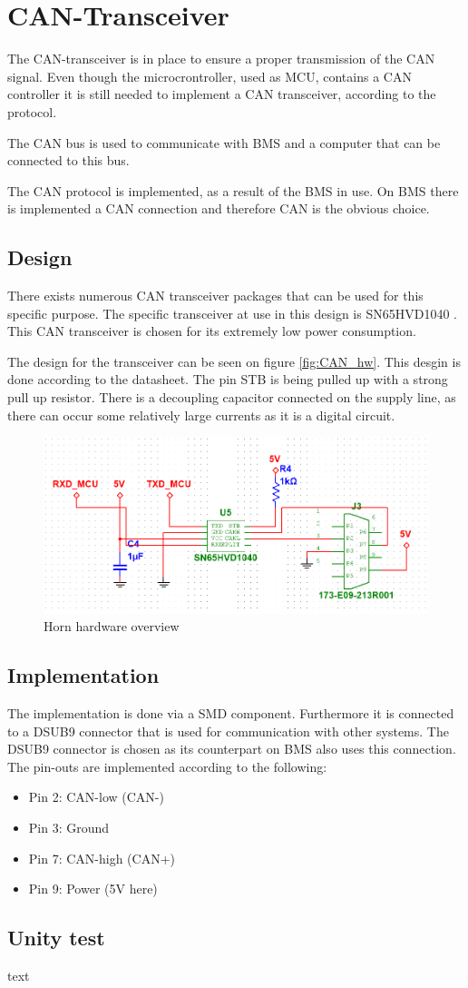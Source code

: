 \section{CAN-Transceiver}
\label{sec:CAN-Tranceiver}
The CAN-transceiver is in place to ensure a proper transmission of the CAN signal. Even though the microcrontroller, used as MCU, contains a CAN controller it is still needed to implement a CAN transceiver, according to the protocol.

The CAN bus is used to communicate with BMS and a computer that can be connected to this bus. 

The CAN protocol is implemented, as a result of the BMS in use. On BMS there is implemented a CAN connection and therefore CAN is the obvious choice.    

\subsection{Design}
There exists numerous CAN transceiver packages that can be used for this specific purpose. The specific transceiver at use in this design is SN65HVD1040 . This CAN transceiver is chosen for its extremely low power consumption. 

The design for the transceiver can be seen on figure \vref{fig:CAN_hw}. This desgin is done according to the datasheet. The pin STB is being pulled up with a strong pull up resistor. There is a decoupling capacitor connected on the supply line, as there can occur some relatively large currents as it is a digital circuit. 

\begin{figure}[H]
	\centering
	\includegraphics[width=0.7\linewidth]{Hardware/Pictures/CAN_transceiver}
	\caption{Horn hardware overview}
	\label{fig:CAN_hw}
\end{figure}

\subsection{Implementation}
The implementation is done via a SMD component. Furthermore it is connected to a DSUB9 connector that is used for communication with other systems. The DSUB9 connector is chosen as its counterpart on BMS also uses this connection. The pin-outs are implemented according to the following:

	\begin{itemize}
		\item Pin 2: CAN-low (CAN-)
		\item Pin 3: Ground
		\item Pin 7: CAN-high (CAN+)
		\item Pin 9: Power (5V here)
	\end{itemize} 

\subsection{Unity test}
text